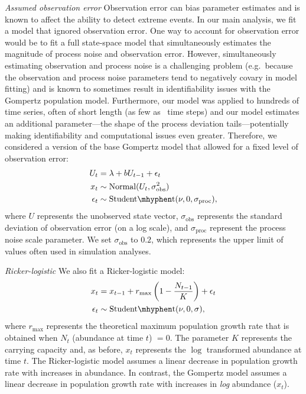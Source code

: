 \emph{Assumed observation error} Observation error can bias parameter estimates\cite{knape2012} and is known to affect the ability to detect extreme events\cite{ward2007}. In our main analysis, we fit a model that ignored observation error. One way to account for observation error would be to fit a full state-space model that simultaneously estimates the magnitude of process noise and observation error. However, simultaneously estimating observation and process noise is a challenging problem (e.g.\ because the observation and process noise parameters tend to negatively covary in model fitting) and is known to sometimes result in identifiability issues with the Gompertz population model\cite{knape2008}. Furthermore, our model was applied to hundreds of time series, often of short length (as few as \minTimeSteps\ time steps) and our model estimates an additional parameter---the shape of the process deviation tails---potentially making identifiability and computational issues even greater. Therefore, we considered a version of the base Gompertz model that allowed for a fixed level of observation error:
\begin{align}
U_t &= \lambda + b U_{t-1} + \epsilon_t\\
x_t &\sim \mathrm{Normal}(U_t, \sigma_\mathrm{obs}^2)\\
\epsilon_t &\sim \mathrm{Student\mhyphen t}(\nu, 0, \sigma_\mathrm{proc}),
\end{align}
where \(U\) represents the unobserved state vector, \(\sigma_\mathrm{obs}\) represents the standard deviation of observation error (on a log scale), and \(\sigma_\mathrm{proc}\) represent the process noise scale parameter. We set \(\sigma_\mathrm{obs}\) to \(0.2\), which represents the upper limit of values often used in simulation analyses\cite{valpine2002, thorson2014b}.

\emph{Ricker-logistic} We also fit a Ricker-logistic model:
\begin{align}
x_t &= x_{t-1} + r_{\mathrm{max}}\left(1 - \frac{N_{t-1}}{K}\right) + \epsilon_t\\
\epsilon_t &\sim \mathrm{Student\mhyphen t}(\nu, 0, \sigma),
\end{align}
where \(r_\mathrm{max}\) represents the theoretical maximum population growth rate that is obtained when \(N_t\) (abundance at time \(t\)) \(= 0\). The parameter \(K\) represents the carrying capacity and, as before, \(x_t\) represents the \(\log\) transformed abundance at time \(t\). The Ricker-logistic model assumes a linear decrease in population growth rate with increases in abundance. In contrast, the Gompertz model assumes a linear decrease in population growth rate with increases in \textit{log} abundance (\(x_t\)).

